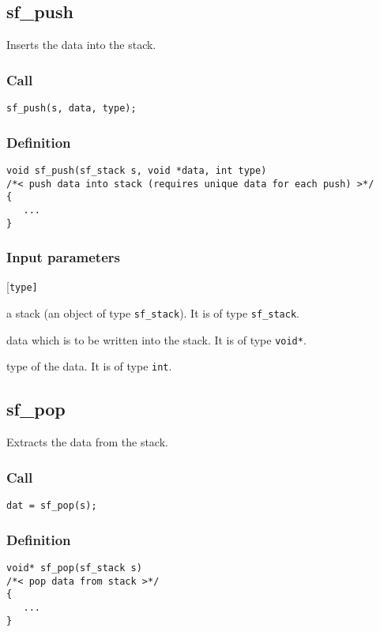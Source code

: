 \subsection{{sf\_push}}
Inserts the data into the stack.

\subsubsection*{Call}
\begin{verbatim}sf_push(s, data, type);\end{verbatim}

\subsubsection*{Definition}
\begin{verbatim}
void sf_push(sf_stack s, void *data, int type)
/*< push data into stack (requires unique data for each push) >*/
{
   ...
}
\end{verbatim}

\subsubsection*{Input parameters}
\begin{desclist}{\tt }{\quad}[\tt type]
   \setlength\itemsep{0pt}
   \item[s ]   a stack (an object of type \texttt{sf\_stack}). It is of type \texttt{sf\_stack}. 
   \item[data] data which is to be written into the stack. It is of type \texttt{void*}.
   \item[type] type of the data. It is of type \texttt{int}.
\end{desclist}




\subsection{{sf\_pop}}
Extracts the data from the stack.

\subsubsection*{Call}
\begin{verbatim}dat = sf_pop(s);\end{verbatim}

\subsubsection*{Definition}
\begin{verbatim}
void* sf_pop(sf_stack s)
/*< pop data from stack >*/ 
{
   ...
}
\end{verbatim}

